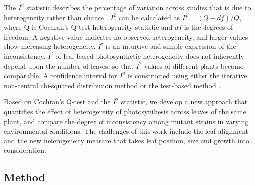 \documentclass{bioinfo}
\begin{document}
{The $I^2$ statistic describes the percentage of variation across studies that is due to heterogeneity rather than chance \citep{higgins2002quantifying,higgins2003measuring}. $I^2$ can be calculated  as $I^2 = (Q - df)/Q$, where Q is Cochran's Q-test heterogeneity statistic and $df$ is the degrees of freedom. A negative value  indicates no observed heterogeneity, and larger values show increasing heterogeneity. $I^2$ is an intuitive and simple expression of the inconsistency. $I^2$ of leaf-based photosynthetic heterogeneity does not inherently depend upon the number of leaves, so that $I^2$ values of different plants become comparable. A confidence interval for $I^2$ is constructed using either the iterative non-central chi-squared distribution method \citep{hedges2001power} or the test-based method \citep{higgins2002quantifying}.

Based on Cochran's Q-test and the $I^2$ statistic, we develop a new approach that quantifies the effect of heterogeneity of photosynthesis across leaves of the same plant, and compare the degree of inconsistency among mutant strains in varying environmental conditions. The challenges of this work include the leaf alignment and the new heterogeneity measure that takes leaf position, size and growth into consideration.


\begin{methods}
\section{Method}\label{sec:PlantPH}




\end{methods}}
\end{document}
